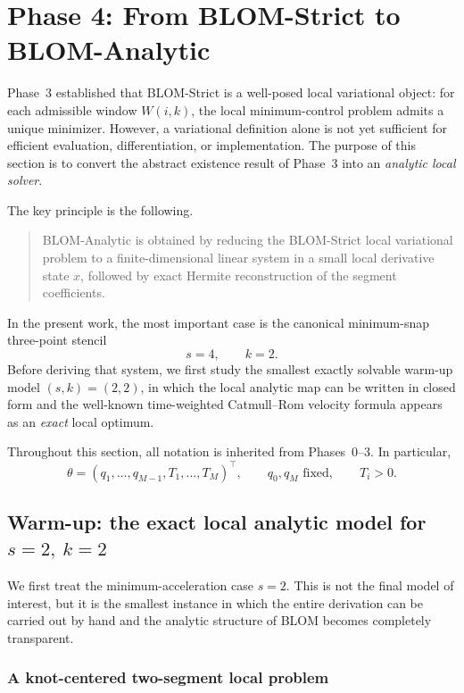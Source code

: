 \section{Phase 4: From BLOM-Strict to BLOM-Analytic}
\label{sec:phase4_blom_analytic}

Phase~3 established that BLOM-Strict is a well-posed local variational object:
for each admissible window \(W(i,k)\), the local minimum-control problem admits a unique minimizer.
However, a variational definition alone is not yet sufficient for efficient evaluation, differentiation, or implementation.
The purpose of this section is to convert the abstract existence result of Phase~3 into an \emph{analytic local solver}.

The key principle is the following.

\begin{quote}
BLOM-Analytic is obtained by reducing the BLOM-Strict local variational problem to a finite-dimensional linear system in a small local derivative state \(x\), followed by exact Hermite reconstruction of the segment coefficients.
\end{quote}

In the present work, the most important case is the canonical minimum-snap three-point stencil
\[
s=4,\qquad k=2.
\]
Before deriving that system, we first study the smallest exactly solvable warm-up model \((s,k)=(2,2)\), in which the local analytic map can be written in closed form and the well-known time-weighted Catmull--Rom velocity formula appears as an \emph{exact} local optimum.

Throughout this section, all notation is inherited from Phases~0--3.
In particular,
\[
\theta=(q_1,\dots,q_{M-1},T_1,\dots,T_M)^\top,
\qquad
q_0,q_M \text{ fixed},
\qquad
T_i>0.
\]

\subsection{Warm-up: the exact local analytic model for \texorpdfstring{$s=2,\ k=2$}{s=2,k=2}}
\label{subsec:phase4_s2_k2}

We first treat the minimum-acceleration case \(s=2\).
This is not the final model of interest, but it is the smallest instance in which the entire derivation can be carried out by hand and the analytic structure of BLOM becomes completely transparent.

\subsubsection{A knot-centered two-segment local problem}
\label{subsubsec:phase4_s2_local_problem}

